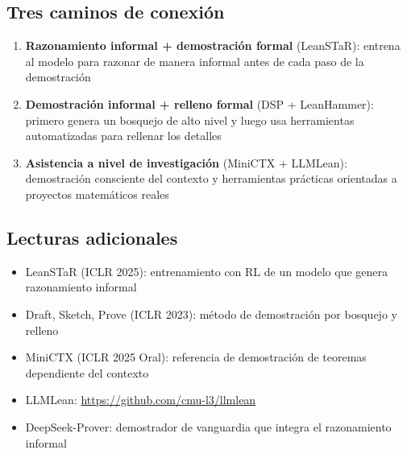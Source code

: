 \documentclass[a4paper]{article}
\begin{document}
\subsection{Tres caminos de conexión}

\begin{enumerate}
    \item \textbf{Razonamiento informal + demostración formal} (LeanSTaR): entrena al modelo para razonar de manera informal antes de cada paso de la demostración
    \item \textbf{Demostración informal + relleno formal} (DSP + LeanHammer): primero genera un bosquejo de alto nivel y luego usa herramientas automatizadas para rellenar los detalles
    \item \textbf{Asistencia a nivel de investigación} (MiniCTX + LLMLean): demostración consciente del contexto y herramientas prácticas orientadas a proyectos matemáticos reales
\end{enumerate}

\subsection{Lecturas adicionales}
\begin{itemize}
    \item LeanSTaR (ICLR 2025): entrenamiento con RL de un modelo que genera razonamiento informal
    \item Draft, Sketch, Prove (ICLR 2023): método de demostración por bosquejo y relleno
    \item MiniCTX (ICLR 2025 Oral): referencia de demostración de teoremas dependiente del contexto
    \item LLMLean: \url{https://github.com/cmu-l3/llmlean}
    \item DeepSeek-Prover: demostrador de vanguardia que integra el razonamiento informal
\end{itemize}
\end{document}
